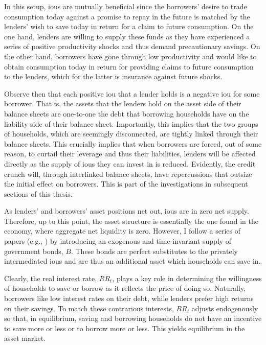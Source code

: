 \documentclass[12pt]{article} %
\numberwithin{equation}{section} %
\numberwithin{figure}{section}
\numberwithin{table}{section}
\begin{document}
In this setup, \Gls{iou}s are mutually beneficial since the borrowers' desire to trade consumption today against a promise to repay in the future is matched by the lenders' wish to save today in return for a claim to future consumption. On the one hand, lenders are willing to supply these funds as they have experienced a series of positive productivity shocks and thus demand precautionary savings. On the other hand, borrowers have gone through low productivity and would like to obtain consumption today in return for providing claims to future consumption to the lenders, which for the latter is insurance against future shocks.

Observe then that each positive \Gls{iou} that a lender holds is a negative \Gls{iou} for some borrower. That is, the assets that the lenders hold on the asset side of their balance sheets are one-to-one the debt that borrowing households have on the liability side of their balance sheet. Importantly, this implies that the two groups of households, which are seemingly disconnected, are tightly linked through their balance sheets. This crucially implies that when borrowers are forced, out of some reason, to curtail their leverage and thus their liabilities, lenders will be affected directly as the supply of \Gls{iou}s they can invest in is reduced. Evidently, the credit crunch will, through interlinked balance sheets, have repercussions that outsize the initial effect on borrowers. This is part of the investigations in subsequent sections of this thesis.

As lenders' and borrowers' asset positions net out, \Gls{iou}s are in zero net supply. Therefore, up to this point, the asset structure is essentially the one found in the \textcite{huggett1993} economy, where aggregate net liquidity is zero. However, I follow a series of papers (e.g.\cite{gl2017}, \cite{bayer2023}) by introducing an exogenous and time-invariant supply of government bonds, $B$. These bonds are perfect substitutes to the privately intermediated \Gls{iou}s and are thus an additional asset which households can save in. %

Clearly, the real interest rate, $RR_t$, plays a key role in determining the willingness of households to save or borrow as it reflects the price of doing so. Naturally, borrowers like low interest rates on their debt, while lenders prefer high returns on their savings. To match these contrarious interests, $RR_t$ adjusts endogenously so that, in equilibrium, saving and borrowing households do not have an incentive to save more or less or to borrow more or less. This yields equilibrium in the asset market.
\end{document}
